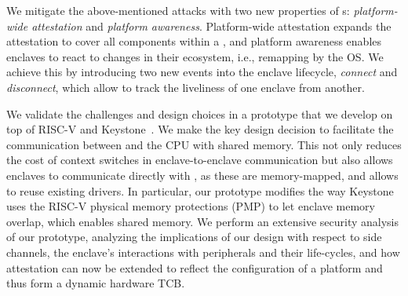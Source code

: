 We mitigate the above-mentioned attacks with two new properties of \nameenclave{}s: \emph{platform-wide attestation} and \emph{platform awareness}. Platform-wide attestation expands the attestation to cover all components within a \nameenclave, and platform awareness enables enclaves to react to changes in their ecosystem, i.e., remapping by the OS.
We achieve this by introducing two new events into the enclave lifecycle, \textit{connect} and \textit{disconnect}, which allow to track the liveliness of one enclave from another.

We validate the challenges and design choices in a prototype that we develop on top of RISC-V and Keystone~\cite{keystone}. We make the key design decision to facilitate the communication between \sphw and the CPU with shared memory. This not only reduces the cost of context switches in enclave-to-enclave communication but also allows enclaves to communicate directly with \sphw, as these are memory-mapped, and allows to reuse existing drivers. In particular, our prototype modifies the way Keystone uses the RISC-V physical memory protections (PMP) to let enclave memory overlap, which enables shared memory. 
We perform an extensive security analysis of our prototype, analyzing the implications of our design with respect to side channels, the enclave's interactions with peripherals and their life-cycles, and how attestation can now be extended to reflect the configuration of a platform and thus form a dynamic hardware TCB. %



